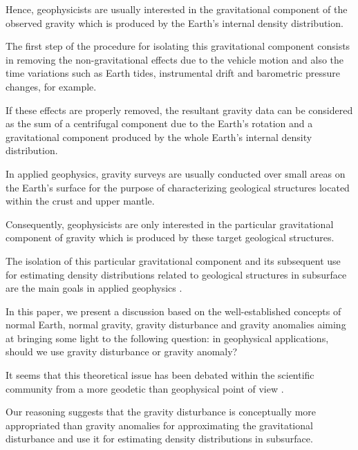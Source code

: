 \documentclass[manuscript]{geophysics}
\begin{document}
Hence, geophysicists are usually interested 
in the gravitational component of the observed gravity 
which is produced by the Earth's internal 
density distribution.


The first step of the procedure for isolating this 
gravitational component consists in removing the non-gravitational effects due 
to the vehicle motion and also the time variations
such as Earth tides, instrumental drift and barometric 
pressure changes, for example.


If these effects are properly removed, the resultant 
gravity data can be considered as the sum of a 
centrifugal component due to the Earth's rotation and
a gravitational component produced by the whole Earth's
internal density distribution.



In applied geophysics, gravity surveys are usually conducted 
over small areas on the Earth's surface for the purpose of 
characterizing geological structures located within the
crust and upper mantle.


Consequently, geophysicists are only interested in the
particular gravitational component of gravity which 
is produced by these target geological structures.


The isolation of this particular gravitational component 
and its subsequent use for estimating density 
distributions related to geological structures in subsurface 
are the main goals in applied geophysics 
\citep{blakely1996}.


In this paper, we present a discussion based on the
well-established concepts of normal Earth, normal gravity, gravity disturbance and gravity anomalies aiming at bringing some
light to the following question: in geophysical applications,
should we use gravity disturbance or gravity anomaly?

It seems that this theoretical issue has been 
debated within the scientific community from a 
more geodetic than geophysical point of view
\citep{lafehr1991, chapin1996, li2001, fairhead2003,
hackney-featherstone2003, hinze2005}.


Our reasoning suggests that the gravity 
disturbance is conceptually more appropriated than 
gravity anomalies for approximating
the gravitational disturbance and use it for estimating 
density distributions in subsurface.
\end{document}

